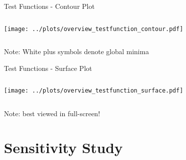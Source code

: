 \documentclass[11pt,aspectratio=169]{beamer}
\begin{document}
%
%

\begin{frame}[fragile]{Test Functions - Contour Plot}

    \begin{columns}
    \begin{column}{0.8\textwidth}
        \texttt{[image: ../plots/overview\_testfunction\_contour.pdf]}
    \end{column}
    \end{columns}
    \tiny{Note: White plus symbols denote global minima}

\end{frame}

%
%

\begin{frame}[fragile]{Test Functions - Surface Plot}

    \begin{columns}
    \begin{column}{0.8\textwidth}
        \texttt{[image: ../plots/overview\_testfunction\_surface.pdf]}
    \end{column}
    \end{columns}

    \tiny{Note: best viewed in full-screen!}

\end{frame}

%
%

\section{Sensitivity Study}

%
%
\end{document}
